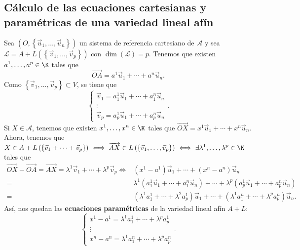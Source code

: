 \subsection*{Cálculo de las ecuaciones cartesianas y paramétricas de una variedad lineal afín}
Sea $\displaystyle \left(O, \left\{ \vec{u}_{1}, \ldots, \vec{u}_{n}\right\} \right) $ un sistema de referencia cartesiano de $\displaystyle \mathcal{A} $ y sea $\displaystyle \mathcal{L} = A + L\left( \left\{ \vec{v}_{1}, \ldots, \vec{v}_{p}\right\} \right) $ con $\displaystyle \dim\left(\mathcal{L}\right) = p $. Tenemos que existen $\displaystyle a^{1}, \ldots, a^{p} \in \K $ tales que
\[ \overrightarrow{OA} = a^{1}\vec{u}_{1} + \cdots + a^{n}\vec{u}_{n}.\]
Como $\displaystyle \left\{ \vec{v}_{1}, \ldots, \vec{v}_{p}\right\} \subset V $, se tiene que
\[
\begin{cases}
\vec{v}_{1} = a^{1}_{1}\vec{u}_{1} + \cdots + a^{n}_{1}\vec{u}_{n} \\
\vdots \\
\vec{v}_{p} = a^{1}_{p}\vec{u}_{1} + \cdots + a^{n}_{p}\vec{u}_{n}
\end{cases}
.\]
Si $\displaystyle X \in \mathcal{A} $, tenemos que existen $\displaystyle x^{1}, \ldots, x^{n} \in \K $ tales que $\displaystyle \overrightarrow{OX} = x^{1}\vec{u}_{1} + \cdots + x^{n}\vec{u}_{n} $. Ahora, tenemos que $\displaystyle X \in A + L\left( \left\{ \vec{v}_{1} + \cdots + \vec{v}_{p}\right\} \right) \iff \overrightarrow{AX} \in L\left( \left\{ \vec{v}_{1}, \ldots, \vec{v}_{p}\right\} \right) \iff \exists \lambda^{1}, \ldots, \lambda^{p} \in \K	$ tales que
\[
\begin{split}
	\overrightarrow{OX} - \overrightarrow{OA} = \overrightarrow{AX} = \lambda^{1}\vec{v}_{1} + \cdots + \lambda^{p}\vec{v}_{p} \iff & \left(x^{1}-a^{1}\right)\vec{u}_{1} + \cdots + \left(x^{n} - a^{n}\right)\vec{u}_{n} \\
	= & \lambda^{1}\left(a^{1}_{1}\vec{u}_{1} + \cdots + a^{n}_{1}\vec{u}_{n}\right) + \cdots + \lambda^{p}\left(a^{1}_{p}\vec{u}_{1} + \cdots + a^{n}_{p}\vec{u}_{n}\right) \\
	= & \left(\lambda^{1}a^{1}_{1}+\cdots +\lambda^{2}a^{1}_{p}\right)\vec{u}_{1} + \cdots + \left(\lambda^{1}a^{n}_{1} + \cdots + \lambda^{p}a^{n}_{p}\right)\vec{u}_{n}.
\end{split}
\]
Así, nos quedan las \textbf{ecuaciones paramétricas} de la variedad lineal afín $\displaystyle A + L $:
\[
\begin{cases}
x^{1}-a^{1} = \lambda^{1}a^{1}_{1} + \cdots + \lambda^{p}a^{1}_{p} \\
\vdots \\
x^{n}-a^{n} = \lambda^{1}a^{n}_{1} + \cdots + \lambda^{p}a^{n}_{p}
\end{cases}
.\]

